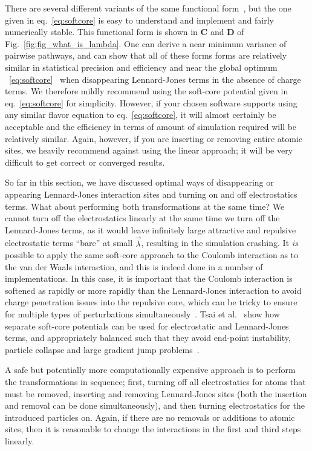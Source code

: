 \documentclass[9pt,bestpractices]{livecoms}
\begin{document}
There are several different variants of the same functional form~\cite{zacharias1994separationshifted, beutler1994avoiding,pham2011identifying,Lee_JChemTheoryComput_2020_v16_p5512,tsai2023amber}, but the one given in eq.~\ref{eq:softcore} is easy to understand and implement and fairly numerically stable. This functional form is shown in \textbf{C} and \textbf{D} of Fig.~\ref{fig:fig_what_is_lambda}.  One can derive a near minimum variance of pairwise pathways, and can show that all of these forms forms are relatively similar in statistical precision and efficiency and near the global optimum ~\ref{eq:softcore}~\cite{pham2012optimal} when disappearing Lennard-Jones terms in the absence of charge terms. We therefore mildly recommend using the soft-core potential given in eq.~\ref{eq:softcore} for simplicity. However, if your chosen software supports using any similar flavor equation to eq.~\ref{eq:softcore}, it will almost certainly be acceptable and the efficiency in terms of amount of simulation required will be relatively similar.  Again, however, if you are inserting or removing entire atomic sites, we heavily recommend against using the linear approach; it will be very difficult to get correct or converged results. 

So far in this section, we have discussed optimal ways of disappearing or appearing Lennard-Jones interaction sites and turning on and off electrostatics terms. What about performing both transformations at the same time? We cannot turn off the electrostatics linearly at the same time we turn off the Lennard-Jones terms, as it would leave infinitely large attractive and repulsive electrostatic terms ``bare'' at small $\vec{\lambda}$, resulting in the simulation crashing. It \textit{is} possible to apply the same soft-core approach to the Coulomb interaction as to the van der Waals interaction, and this is indeed done in a number of implementations. In this case, it is important that the Coulomb interaction is softened as rapidly or more rapidly than the Lennard-Jones interaction to avoid charge penetration issues into the repulsive core, which  can be tricky to ensure for multiple types of perturbations simultaneously~\cite{steinbrecher2011softcore}. Tsai et al.~\cite{tsai2023amber} show how separate soft-core potentials can be used for electrostatic and Lennard-Jones terms, and appropriately balanced such that they avoid end-point instability, particle collapse and large gradient jump problems~\cite{tsai2023amber}.

A safe but potentially more computationally expensive approach is to perform the transformations in sequence; first, turning off all electrostatics for atoms that must be removed, inserting and removing Lennard-Jones sites (both the insertion and removal can be done simultaneously), and then turning electrostatics for the introduced particles on. Again, if there are no removals or additions to atomic sites, then it is reasonable to change the interactions in the first and third steps  linearly. 
\end{document}
